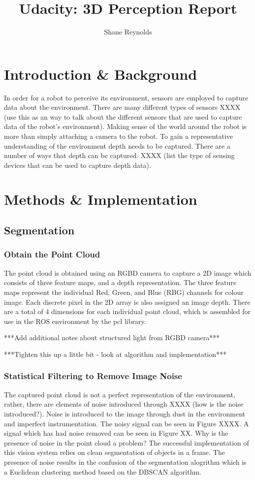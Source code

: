 \documentclass[a4paper]{article}
\begin{document}
\title{Udacity: 3D Perception Report}
\author{Shane Reynolds}
\maketitle
\section{Introduction \& Background}
In order for a robot to perceive its environment, sensors are employed to capture data about the environment. There are many different types of sensors XXXX (use this as an way to talk about the different sensors that are used to capture data of the robot's environment). Making sense of the world around the robot is more than simply attaching a camera to the robot. To gain a representative understanding of the environment depth needs to be captured. There are a number of ways that depth can be captured. XXXX (list the type of sensing devices that can be used to capture depth data). 

\section{Methods \& Implementation}
\subsection{Segmentation}
\subsubsection{Obtain the Point Cloud}
The point cloud is obtained using an RGBD camera to capture a 2D image which consists of three feature maps, and a depth representation. The three feature maps represent the individual Red, Green, and Blue (RBG) channels for colour image. Each discrete pixel in the 2D array is also assigned an image depth. There are a total of 4 dimensions for each individual point cloud, which is assembled for use in the ROS environment by the pcl library.
 
***Add additional notes about structured light from RGBD camera***

***Tighten this up a little bit - look at algorithm and implementation***

\subsubsection{Statistical Filtering to Remove Image Noise}
The captured point cloud is not a perfect representation of the environment, rather, there are elements of noise introduced through XXXX (how is the noise introduced?). Noise is introduced to the image through dust in the environment and imperfect instrumentation. The noisy signal can be seen in Figure XXXX. A signal which has had noise removed can be seen in Figure XX. Why is the presence of noise in the point cloud a problem? The successful implementation of this vision system relies on clean segmentation of objects in a frame. The presence of noise results in the confusion of the segmentation alogrithm which is a Euclidean clustering method based on the DBSCAN algorithm.
\end{document}

